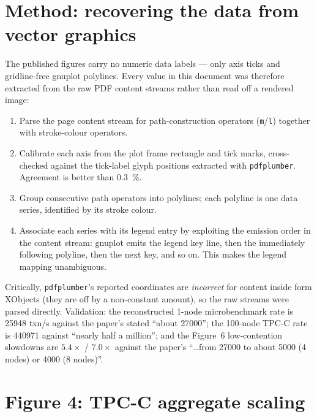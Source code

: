\documentclass[11pt,a4paper]{article}
\begin{document}
\section{Method: recovering the data from vector graphics}
\label{sec:method}

The published figures carry no numeric data labels --- only axis ticks and
gridline-free gnuplot polylines. Every value in this document was therefore
extracted from the raw PDF content streams rather than read off a rendered
image:

\begin{enumerate}[leftmargin=1.4em,itemsep=2pt]
\item Parse the page content stream for path-construction operators
      (\texttt{m}/\texttt{l}) together with stroke-colour operators.
\item Calibrate each axis from the plot frame rectangle and tick marks,
      cross-checked against the tick-label glyph positions extracted with
      \texttt{pdfplumber}.  Agreement is better than \SI{0.3}{\percent}.
\item Group consecutive path operators into polylines; each polyline is one
      data series, identified by its stroke colour.
\item Associate each series with its legend entry by exploiting the
      emission order in the content stream: gnuplot emits the legend key
      line, then the immediately following polyline, then the next key, and
      so on.  This makes the legend mapping unambiguous.
\end{enumerate}

Critically, \texttt{pdfplumber}'s reported coordinates are \emph{incorrect}
for content inside form XObjects (they are off by a non-constant amount), so
the raw streams were parsed directly.  Validation: the reconstructed 1-node
microbenchmark rate is \num{25948} txn/s against the paper's stated
``about \num{27000}''; the 100-node TPC-C rate is \num{440971} against
``nearly half a million''; and the Figure~6 low-contention slowdowns are
$5.4\times$ / $7.0\times$ against the paper's ``\ldots{}from \num{27000} to
about \num{5000} (4 nodes) or \num{4000} (8 nodes)''.

\section{Figure 4: TPC-C aggregate scaling}
\label{sec:fig4}
\end{document}
